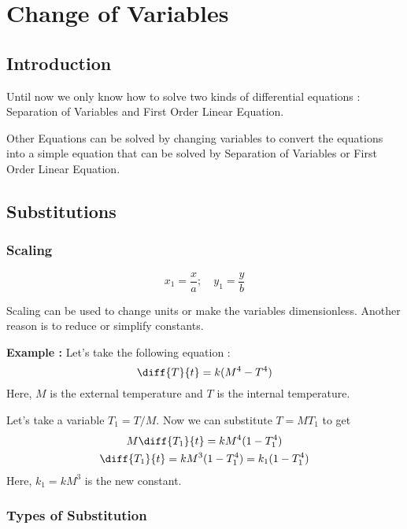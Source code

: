 


\chapter{Change of Variables} 

\bigbreak

\section{Introduction}

Until now we only know how to solve two kinds of differential equations :
Separation of Variables and First Order Linear Equation.

Other Equations can be solved by changing variables to convert the equations into a simple equation
that can be solved by Separation of Variables or First Order Linear Equation.

\section{Substitutions}

\subsection{Scaling}

$$ x_1 = \frac{x}{a} ; \quad y_1 = \frac{y}{b} $$

Scaling can be used to change units or make the variables dimensionless.
Another reason is to reduce or simplify constants.

{\bf Example : } Let's take the following equation : 
$$ \diff{T}{t} = k(M^4 - T^4) $$
Here, $M$ is the external temperature and $T$ is the internal temperature.

Let's take a variable $T_1 = T / M$. 
Now we can substitute $T = M T_1$ to get 
\begin{gather*}
    M \diff{T_1}{t} = k M^4(1 - T_1^4) \\
    \diff{T_1}{t} = k M^3 (1 - T_1^4) = k_1 (1 - T_1^4) 
\end{gather*} 
Here, $k_1 = k M^3$ is the new constant.

\subsection{Types of Substitution}

